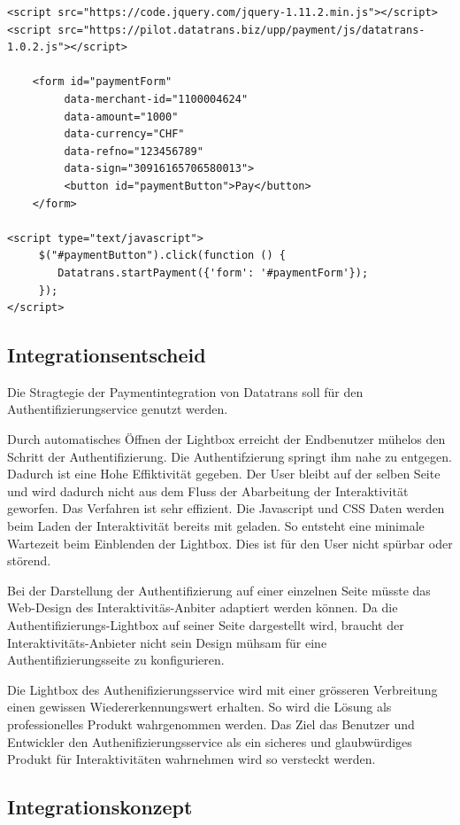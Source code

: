 \begin{verbatim}
<script src="https://code.jquery.com/jquery-1.11.2.min.js"></script>
<script src="https://pilot.datatrans.biz/upp/payment/js/datatrans-1.0.2.js"></script>

    <form id="paymentForm"
         data-merchant-id="1100004624"
         data-amount="1000"
         data-currency="CHF"
         data-refno="123456789"
         data-sign="30916165706580013">
         <button id="paymentButton">Pay</button>
    </form>
    
<script type="text/javascript">
     $("#paymentButton").click(function () {
        Datatrans.startPayment({'form': '#paymentForm'});
     });
</script>
\end{verbatim}

\subsection{Integrationsentscheid}\label{integrationsentscheid}

Die Stragtegie der Paymentintegration von Datatrans soll für den
Authentifizierungservice genutzt werden.

Durch automatisches Öffnen der Lightbox erreicht der Endbenutzer mühelos
den Schritt der Authentifizierung. Die Authentifzierung springt ihm nahe
zu entgegen. Dadurch ist eine Hohe Effiktivität gegeben. Der User bleibt
auf der selben Seite und wird dadurch nicht aus dem Fluss der
Abarbeitung der Interaktivität geworfen. Das Verfahren ist sehr
effizient. Die Javascript und CSS Daten werden beim Laden der
Interaktivität bereits mit geladen. So entsteht eine minimale Wartezeit
beim Einblenden der Lightbox. Dies ist für den User nicht spürbar oder
störend.

Bei der Darstellung der Authentifizierung auf einer einzelnen Seite
müsste das Web-Design des Interaktivitäs-Anbiter adaptiert werden
können. Da die Authentifizierungs-Lightbox auf seiner Seite dargestellt
wird, braucht der Interaktivitäts-Anbieter nicht sein Design mühsam für
eine Authentifizierungsseite zu konfigurieren.

Die Lightbox des Authenifizierungsservice wird mit einer grösseren
Verbreitung einen gewissen Wiedererkennungswert erhalten. So wird die
Lösung als professionelles Produkt wahrgenommen werden. Das Ziel das
Benutzer und Entwickler den Authenifizierungsservice als ein sicheres
und glaubwürdiges Produkt für Interaktivitäten wahrnehmen wird so
versteckt werden.

\hypertarget{integrationskonzept}{\subsection{Integrationskonzept}\label{integrationskonzept}}

